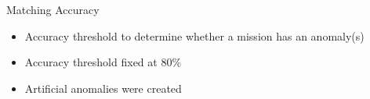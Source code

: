 \begin{frame}{Matching Accuracy}
    \begin{itemize}
        \item Accuracy threshold to determine whether a mission has an anomaly(s)
        \item Accuracy threshold fixed at 80\%
        \item Artificial anomalies were created
    \end{itemize}
\end{frame}

